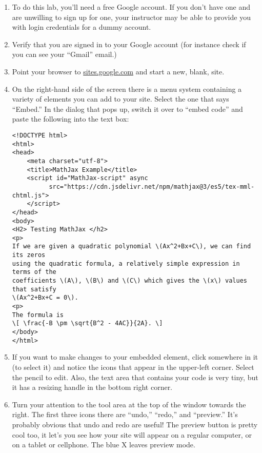 \begin{enumerate}
	\item To do this lab, you'll need a free Google account.  If you don't have one and are unwilling to sign up for one, your instructor may be able to provide you with login credentials for a dummy account.
	\item Verify that you are signed in to your Google account (for instance check if you can see your ``Gmail'' email.)
	\item Point your browser to \url{sites.google.com} and start a new, blank, site. 
  \item On the right-hand side of the screen there is a menu system containing a variety of elements you can add to your site.  Select the one that says ``Embed.''  In the dialog that pops up, switch it over to ``embed code'' and paste the following into the text box:
\begin{codeblock}
\begin{verbatim}
<!DOCTYPE html>
<html>
<head>
    <meta charset="utf-8">
    <title>MathJax Example</title>
    <script id="MathJax-script" async
          src="https://cdn.jsdelivr.net/npm/mathjax@3/es5/tex-mml-chtml.js">
    </script>
</head>
<body>
<H2> Testing MathJax </h2>
<p>
If we are given a quadratic polynomial \(Ax^2+Bx+C\), we can find its zeros 
using the quadratic formula, a relatively simple expression in terms of the 
coefficients \(A\), \(B\) and \(C\) which gives the \(x\) values that satisfy 
\(Ax^2+Bx+C = 0\).
<p>
The formula is
\[ \frac{-B \pm \sqrt{B^2 - 4AC}}{2A}. \]
</body>
</html>
\end{verbatim}
\end{codeblock}

\item If you want to make changes to your embedded element, click somewhere in it (to select it) and notice the icons that appear in the upper-left corner.  Select the pencil to edit.  Also, the text area that contains your code is very tiny, but it has a resizing handle in the bottom right corner.

\item Turn your attention to the tool area at the top of the window towards the right.  The first three icons there are ``undo,'' ``redo,'' and ``preview.''  It's probably obvious that undo and redo are useful!  The preview button is pretty cool too, it let's you see how your site will appear on a regular computer, or on a tablet or cellphone.  The blue X leaves preview mode.


\end{enumerate}
